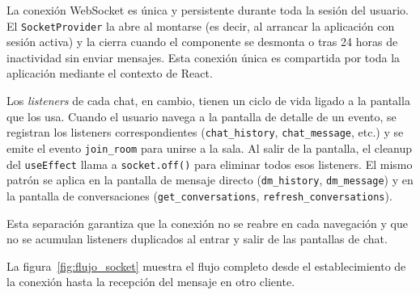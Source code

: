 La conexión WebSocket es única y persistente durante toda la sesión del usuario. El \texttt{SocketProvider} la abre al montarse (es decir, al arrancar la aplicación con sesión activa) y la cierra cuando el componente se desmonta o tras 24 horas de inactividad sin enviar mensajes. Esta conexión única es compartida por toda la aplicación mediante el contexto de React.

Los \textit{listeners} de cada chat, en cambio, tienen un ciclo de vida ligado a la pantalla que los usa. Cuando el usuario navega a la pantalla de detalle de un evento, se registran los listeners correspondientes (\texttt{chat\_history}, \texttt{chat\_message}, etc.) y se emite el evento \texttt{join\_room} para unirse a la sala. Al salir de la pantalla, el cleanup del \texttt{useEffect} llama a \texttt{socket.off()} para eliminar todos esos listeners. El mismo patrón se aplica en la pantalla de mensaje directo (\texttt{dm\_history}, \texttt{dm\_message}) y en la pantalla de conversaciones (\texttt{get\_conversations}, \texttt{refresh\_conversations}).

Esta separación garantiza que la conexión no se reabre en cada navegación y que no se acumulan listeners duplicados al entrar y salir de las pantallas de chat.

La figura~\ref{fig:flujo_socket} muestra el flujo completo desde el establecimiento de la conexión hasta la recepción del mensaje en otro cliente.

